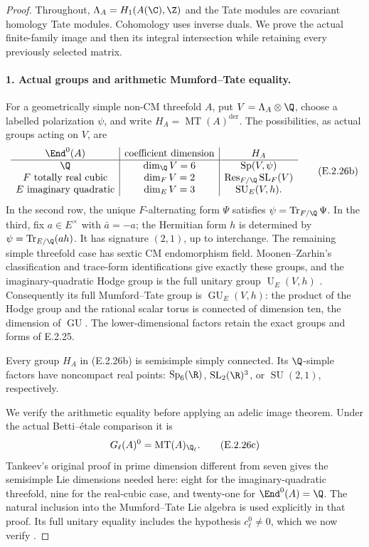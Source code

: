 \begin{proof}
Throughout, \(\Lambda_A=H_1(A(\C),\Z)\) and the Tate modules
are covariant homology Tate modules. Cohomology uses inverse duals.
We prove the actual finite-family image and then its integral
intersection while retaining every previously selected matrix.

\paragraph{1. Actual groups and arithmetic Mumford--Tate equality.}
For a geometrically simple non-CM threefold \(A\), put
\(V=\Lambda_A\otimes\Q\), choose a labelled polarization \(\psi\),
and write \(H_A=\operatorname{MT}(A)^{\mathrm{der}}\).
The possibilities, as actual groups acting on \(V\), are
\[
\begin{array}{c|c|c}
 \End^0(A)&\text{coefficient dimension}&H_A\\ \hline
 \Q&\dim_{\Q}V=6&\operatorname{Sp}(V,\psi)\\
 F\text{ totally real cubic}&\dim_FV=2
      &\operatorname{Res}_{F/\Q}\operatorname{SL}_F(V)\\
 E\text{ imaginary quadratic}&\dim_EV=3
      &\operatorname{SU}_E(V,h).
\end{array}
\tag{E.2.26b}
\]
In the second row, the unique \(F\)-alternating form \(\Psi\)
satisfies \(\psi=\operatorname{Tr}_{F/\Q}\Psi\). In the third,
fix \(a\in E^\times\) with \(\bar a=-a\); the Hermitian form
\(h\) is determined by \(\psi=\operatorname{Tr}_{E/\Q}(a h)\).
It has signature \((2,1)\), up to interchange. The remaining simple
threefold case has sextic CM endomorphism field. Moonen--Zarhin's
classification and trace-form identifications give exactly these
groups, and the imaginary-quadratic Hodge group is the full unitary
group \(\operatorname U_E(V,h)\)
\cite[Section 2.3 and Proposition 2.4, author p.~9;
Theorem 2.7, author p.~10]{GenMoonenZarhin1999}.
Consequently its full Mumford--Tate group is
\(\operatorname{GU}_E(V,h)\): the product of the Hodge group and
the rational scalar torus is connected of dimension ten, the
dimension of \(\operatorname{GU}\). The lower-dimensional factors
retain the exact groups and forms of E.2.25.

Every group \(H_A\) in (E.2.26b) is semisimple simply connected.
Its \(\Q\)-simple factors have noncompact real points:
\(\operatorname{Sp}_6(\R)\), \(\operatorname{SL}_2(\R)^3\),
or \(\operatorname{SU}(2,1)\), respectively.

We verify the arithmetic equality before applying an adelic image
theorem. Under the actual Betti--\'{e}tale comparison it is
\[
 G_\ell(A)^0=\operatorname{MT}(A)_{\Q_\ell}.
 \tag{E.2.26c}
\]
Tankeev's original proof in prime dimension different from seven
gives the semisimple Lie dimensions needed here: eight for the
imaginary-quadratic threefold, nine for the real-cubic case, and
twenty-one for \(\End^0(A)=\Q\). The natural inclusion into the
Mumford--Tate Lie algebra is used explicitly in that proof. Its full
unitary equality includes the hypothesis \(c_\ell^0\ne0\), which
we now verify
\cite[Lemma 3 and proof, pp.~532--535; type-I cases,
pp.~535--539]{GenTankeev1988}.


\end{proof}
